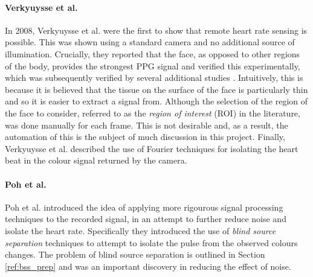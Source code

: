 \paragraph{Verkyuysse et al.}
In 2008, Verkyuysse et al. \cite{Verkruysse2008} were the first to show that remote heart rate sensing is possible. This was shown using a standard camera and no additional source of 
illumination. Crucially, they reported that the face, as opposed to other regions of the body, provides the strongest PPG signal and verified this experimentally, which was subsequently
verified by several additional studies \cite{vanderKooij2019}. Intuitively, this is because
it is believed that the tissue on the surface of the face is particularly thin and so it is easier to extract a signal from. 
Although the selection of the region of the face to consider, referred to as the \textit{region of interest} (ROI) in the literature, was done manually for each frame. This is not desirable and, 
as a result, the automation of this is the subject of much discussion in this project. Finally, Verkyuysse et al. \cite{Verkruysse2008} described the use of Fourier techniques for isolating the 
heart beat in the colour signal returned by the camera.

\paragraph{Poh et al.}
Poh et al. \cite{poh2010non} introduced the idea of applying more rigourous signal processing techniques to the recorded signal, in an attempt to further reduce noise and isolate the heart rate.
Specifically they introduced the use of \textit{blind source separation} techniques to attempt to isolate the pulse from the observed colours changes. The problem of blind source separation is 
outlined in Section \ref{ref:bss_prep} and was an important discovery in reducing the effect of noise.


